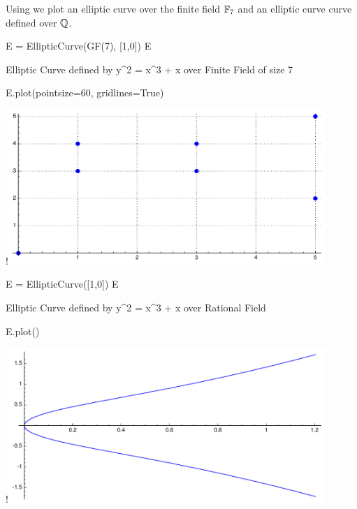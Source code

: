 Using \sage we plot an elliptic curve over the finite field
$\mathbb{F}_7$ and an elliptic curve curve defined over $\mathbb{Q}$.
\begin{sagecode} %
\begin{sagecell}
E = EllipticCurve(GF(7), [1,0])
E
\end{sagecell}
\begin{sageout}
Elliptic Curve defined by y^2 = x^3 + x over
    Finite Field of size 7
\end{sageout}
\end{sagecode}
\begin{sagecode}
\begin{sagecell}
E.plot(pointsize=60, gridlines=True)
\end{sagecell}
\begin{sageout}[escapechar=!]
!\includegraphics[width=0.9\textwidth]{graphics/ecmod7}
\end{sageout}
\end{sagecode}

\begin{sagecode} %
\begin{sagecell}
E = EllipticCurve([1,0])
E
\end{sagecell}
\begin{sageout}
Elliptic Curve defined by y^2 = x^3 + x over
    Rational Field
\end{sageout}
\end{sagecode}
\begin{sagecode}
\begin{sagecell}
E.plot()
\end{sagecell}
\begin{sageout}[escapechar=!]
!\includegraphics[width=0.9\textwidth]{graphics/ecq}
\end{sageout}
\end{sagecode}

